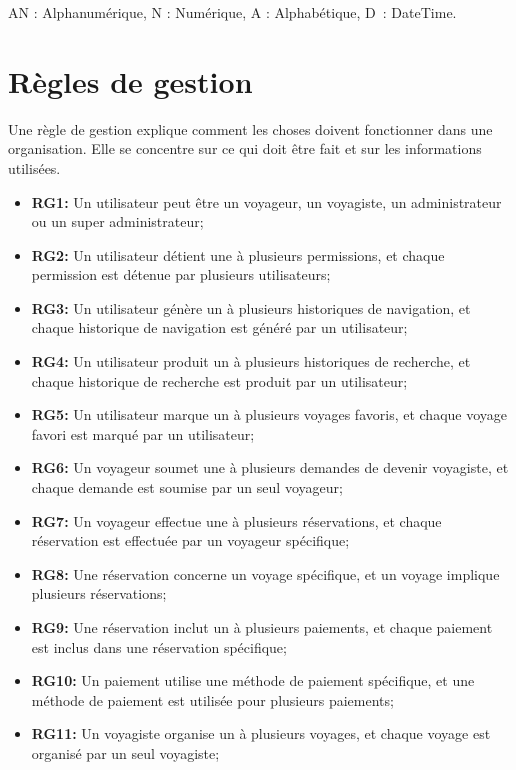 \documentclass[12pt]{report}
\begin{document}
				AN : Alphanumérique, N : Numérique, A : Alphabétique, D : DateTime.




			\section{Règles de gestion}

			\hspace{15pt} Une règle de gestion explique comment les choses doivent fonctionner dans une organisation. Elle se concentre sur ce qui doit être fait et sur les informations utilisées.

			\begin{itemize}
			    \item \textbf{RG1:} Un utilisateur peut être un voyageur, un voyagiste, un administrateur ou un super administrateur;
			    \item \textbf{RG2:} Un utilisateur détient une à plusieurs permissions, et chaque permission est détenue par plusieurs utilisateurs;
			    \item \textbf{RG3:} Un utilisateur génère un à plusieurs historiques de navigation, et chaque historique de navigation est généré par un utilisateur;
			    \item \textbf{RG4:} Un utilisateur produit un à plusieurs historiques de recherche, et chaque historique de recherche est produit par un utilisateur;
			    \item \textbf{RG5:} Un utilisateur marque un à plusieurs voyages favoris, et chaque voyage favori est marqué par un utilisateur;
			    \item \textbf{RG6:} Un voyageur soumet une à plusieurs demandes de devenir voyagiste, et chaque demande est soumise par un seul voyageur;
			    \item \textbf{RG7:} Un voyageur effectue une à plusieurs réservations, et chaque réservation est effectuée par un voyageur spécifique;
			    \item \textbf{RG8:} Une réservation concerne un voyage spécifique, et un voyage implique plusieurs réservations;
			    \item \textbf{RG9:} Une réservation inclut un à plusieurs paiements, et chaque paiement est inclus dans une réservation spécifique;
			    \item \textbf{RG10:} Un paiement utilise une méthode de paiement spécifique, et une méthode de paiement est utilisée pour plusieurs paiements;
			    \item \textbf{RG11:} Un voyagiste organise un à plusieurs voyages, et chaque voyage est organisé par un seul voyagiste;

\end{itemize}
\end{document}

